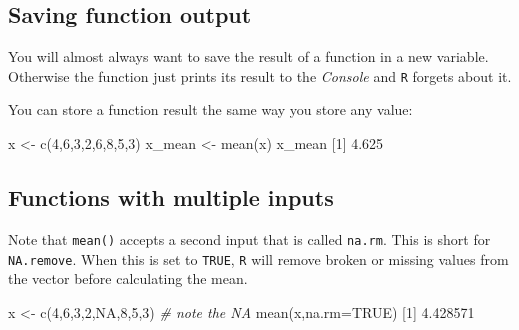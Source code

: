 \documentclass[
]{book}
\newenvironment{Shaded}{\begin{snugshade}}{\end{snugshade}}
\newcommand{\AttributeTok}[1]{\textcolor[rgb]{0.77,0.63,0.00}{#1}}
\newcommand{\CommentTok}[1]{\textcolor[rgb]{0.56,0.35,0.01}{\textit{#1}}}
\newcommand{\ConstantTok}[1]{\textcolor[rgb]{0.00,0.00,0.00}{#1}}
\newcommand{\DecValTok}[1]{\textcolor[rgb]{0.00,0.00,0.81}{#1}}
\newcommand{\FloatTok}[1]{\textcolor[rgb]{0.00,0.00,0.81}{#1}}
\newcommand{\FunctionTok}[1]{\textcolor[rgb]{0.00,0.00,0.00}{#1}}
\newcommand{\NormalTok}[1]{#1}
\newcommand{\OtherTok}[1]{\textcolor[rgb]{0.56,0.35,0.01}{#1}}
\begin{document}
\hypertarget{saving-function-output}{%
\subsection*{Saving function output}\label{saving-function-output}}

You will almost always want to save the result of a function in a new variable. Otherwise the function just prints its result to the \emph{Console} and \texttt{R} forgets about it.

You can store a function result the same way you store any value:

\begin{Shaded}
\begin{Highlighting}[]
\NormalTok{x }\OtherTok{\textless{}{-}} \FunctionTok{c}\NormalTok{(}\DecValTok{4}\NormalTok{,}\DecValTok{6}\NormalTok{,}\DecValTok{3}\NormalTok{,}\DecValTok{2}\NormalTok{,}\DecValTok{6}\NormalTok{,}\DecValTok{8}\NormalTok{,}\DecValTok{5}\NormalTok{,}\DecValTok{3}\NormalTok{) }
\NormalTok{x\_mean }\OtherTok{\textless{}{-}} \FunctionTok{mean}\NormalTok{(x) }
\NormalTok{x\_mean}
\NormalTok{[}\DecValTok{1}\NormalTok{] }\FloatTok{4.625}
\end{Highlighting}
\end{Shaded}

\hypertarget{functions-with-multiple-inputs}{%
\subsection*{Functions with multiple inputs}\label{functions-with-multiple-inputs}}

Note that \texttt{mean()} accepts a second input that is called \texttt{na.rm}. This is short for \texttt{NA.remove}. When this is set to \texttt{TRUE}, \texttt{R} will remove broken or missing values from the vector before calculating the mean.

\begin{Shaded}
\begin{Highlighting}[]
\NormalTok{x }\OtherTok{\textless{}{-}} \FunctionTok{c}\NormalTok{(}\DecValTok{4}\NormalTok{,}\DecValTok{6}\NormalTok{,}\DecValTok{3}\NormalTok{,}\DecValTok{2}\NormalTok{,}\ConstantTok{NA}\NormalTok{,}\DecValTok{8}\NormalTok{,}\DecValTok{5}\NormalTok{,}\DecValTok{3}\NormalTok{)  }\CommentTok{\# note the NA}
\FunctionTok{mean}\NormalTok{(x,}\AttributeTok{na.rm=}\ConstantTok{TRUE}\NormalTok{)}
\NormalTok{[}\DecValTok{1}\NormalTok{] }\FloatTok{4.428571}
\end{Highlighting}
\end{Shaded}
\end{document}
